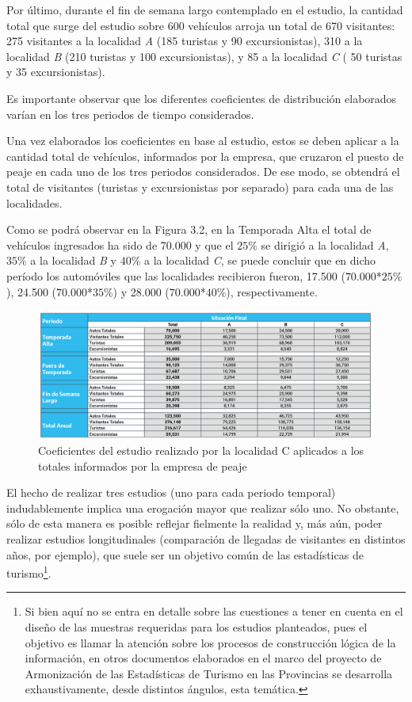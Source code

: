 \documentclass[
]{book}
\begin{document}
Por último, durante el fin de semana largo contemplado en el estudio, la cantidad total que surge del estudio sobre 600 vehículos arroja un total de 670 visitantes: 275 visitantes a la localidad \emph{A} (185 turistas y 90 excursionistas), 310 a la localidad \emph{B} (210 turistas y 100 excursionistas), y 85 a la localidad \emph{C} ( 50 turistas y 35 excursionistas).

Es importante observar que los diferentes coeficientes de distribución elaborados varían en los tres periodos de tiempo considerados.

Una vez elaborados los coeficientes en base al estudio, estos se deben aplicar a la cantidad total de vehículos, informados por la empresa, que cruzaron el puesto de peaje en cada uno de los tres periodos considerados. De ese modo, se obtendrá el total de visitantes (turistas y excursionistas por separado) para cada una de las localidades.

Como se podrá observar en la Figura 3.2, en la Temporada Alta el total de vehículos ingresados ha sido de 70.000 y que el \(25\%\) se dirigió a la localidad \emph{A}, \(35\%\) a la localidad \emph{B} y \(40\%\) a la localidad \emph{C}, se puede concluir que en dicho período los automóviles que las localidades recibieron fueron, 17.500 (\(70.000\)*\(25\%\)), 24.500 (\(70.000\)*\(35\%\)) y 28.000 (\(70.000\)*\(40\%\)), respectivamente.

\begin{figure}

{\centering \includegraphics[width=1\linewidth]{imagenes/figura5A} 

}

\caption{Coeficientes del estudio realizado por la localidad C aplicados a los totales informados por la empresa de peaje}\label{fig:coeficientes}
\end{figure}

El hecho de realizar tres estudios (uno para cada periodo temporal) indudablemente implica una erogación mayor que realizar sólo uno. No obstante, sólo de esta manera es posible reflejar fielmente la realidad y, más aún, poder realizar estudios longitudinales (comparación de llegadas de visitantes en distintos años, por ejemplo), que suele ser un objetivo común de las estadísticas de turismo\footnote{Si bien aquí no se entra en detalle sobre las cuestiones a tener en cuenta en el diseño de las muestras requeridas para los estudios planteados, pues el objetivo es llamar la atención sobre los procesos de construcción lógica de la información, en otros documentos elaborados en el marco del proyecto de Armonización de las Estadísticas de Turismo en las Provincias se desarrolla exhaustivamente, desde distintos ángulos, esta temática.}.
\end{document}
